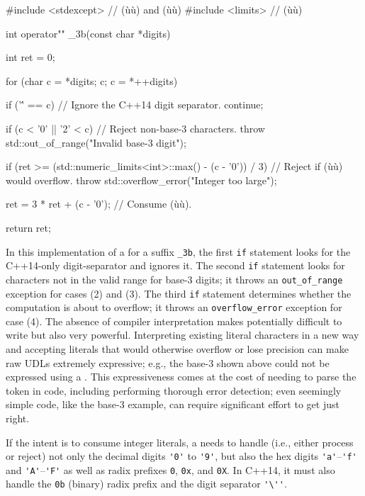 \begin{emcppslisting}
#include <stdexcept>  // (ù{}ù) and (ù{}ù)
#include <limits>     // (ù{}ù)

int operator"" _3b(const char *digits)
{
    int ret = 0;

    for (char c = *digits; c; c = *++digits)
    {
        if ('\'' == c)  // Ignore the C++14 digit separator.
        {
            continue;
        }

        if (c < '0' || '2' < c)  // Reject non-base-3 characters.
        {
            throw std::out_of_range("Invalid base-3 digit");
        }

        if (ret >= (std::numeric_limits<int>::max() - (c - '0')) / 3)
        {
            // Reject if (ù{}ù) would overflow.
            throw std::overflow_error("Integer too large");
        }

        ret = 3 * ret + (c - '0');  // Consume (ù{}ù).
    }

    return ret;
}
\end{emcppslisting}
    
\noindent In this implementation of a  for a suffix
\lstinline!_3b!, the first \lstinline!if! statement looks for the C++14-only digit-separator and ignores it. The second \lstinline!if! statement
looks for characters not in the valid range for base-3 digits; it throws
an \lstinline!out_of_range! exception for cases (2) and (3). The third
\lstinline!if! statement determines whether the computation is about to
overflow; it throws an \lstinline!overflow_error! exception for case (4).
The absence of compiler interpretation makes 
potentially difficult to write but also very powerful. Interpreting
existing literal characters in a new way and accepting literals that
would otherwise overflow or lose precision can make raw UDLs extremely
expressive; e.g., the base-3  shown above could
not be expressed using a . This
expressiveness comes at the cost of needing to parse the token in code,
including performing thorough error detection; even seemingly simple
code, like the base-3 example, can require significant effort to get
just right.

If the intent is to consume integer literals, a  needs to handle (i.e., either process or reject) not only the
decimal digits \lstinline!'0'! to \lstinline!'9'!, but also the hex digits
\lstinline!'a'!--\lstinline!'f'! and \lstinline!'A'!--\lstinline!'F'! as well as
radix prefixes \lstinline!0!, \lstinline!0x!, and \lstinline!0X!. In C++14, it
must also handle the \lstinline!0b! (binary) radix prefix and the digit
separator \lstinline!'\''!.  

